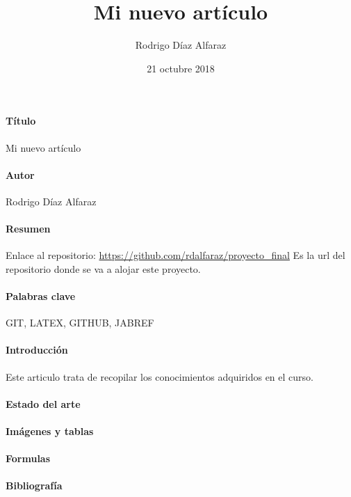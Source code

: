\documentclass[a4paper,11pt]{article}
\begin{document}
\title{Mi nuevo artículo} 
\author{Rodrigo Díaz Alfaraz}
\date{21 octubre 2018}
\maketitle

\paragraph*{Título}
Mi nuevo artículo

\paragraph*{Autor}
Rodrigo Díaz Alfaraz

\paragraph*{Resumen}  Enlace al repositorio:
\url{https://github.com/rdalfaraz/proyecto_final} Es la url del repositorio donde se va a alojar este proyecto.

\paragraph*{Palabras clave}
\linebreak
GIT, LATEX, GITHUB, JABREF

\paragraph*{Introducción}
\linebreak
Este articulo trata de recopilar los conocimientos adquiridos en el curso. 

\paragraph*{Estado del arte}
\paragraph*{Imágenes y tablas}
\paragraph*{Formulas}
\paragraph*{Bibliografía}
\end{document}
